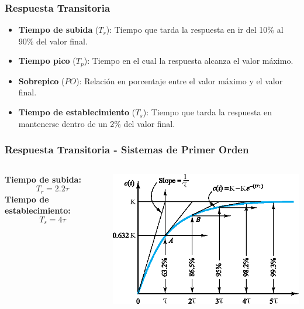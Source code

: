 \documentclass[aspectratio=169,handout]{beamer}
\theoremstyle{definition}
\theoremstyle{plain}
\theoremstyle{remark}
\begin{document}
\begin{frame}[<-+>]\frametitle{Respuesta Transitoria}
  \begin{itemize}
    \item \textbf{Tiempo de subida} ($T_r$): Tiempo que tarda la respuesta en ir del 10\% al 90\% del valor final.
    \item \textbf{Tiempo pico} ($T_p$): Tiempo en el cual la respuesta alcanza el valor máximo.
    \item \textbf{Sobrepico} ($PO$): Relación en porcentaje entre el valor máximo y el valor final.
    \item \textbf{Tiempo de establecimiento} ($T_s$): Tiempo que tarda la respuesta en mantenerse dentro de un 2\% del valor final.
  \end{itemize}
\end{frame}

\begin{frame}[<-+>]\frametitle{Respuesta Transitoria - Sistemas de Primer Orden}
\vspace*{3mm}
\begin{columns}
 \begin{column}{0.3\textwidth}
 \textbf{Tiempo de subida:}
 \begin{equation*}
   T_r = 2.2 \tau
 \end{equation*}
 \textbf{Tiempo de establecimiento:}
 \begin{equation*}
  T_s = 4 \tau
 \end{equation*}
 \end{column} 
 \begin{column}{0.7\textwidth}
  \centering
  \includegraphics[width=10cm]{images/firstOrderResponse.eps}
 \end{column} 
\end{columns}
\end{frame}
\end{document}
